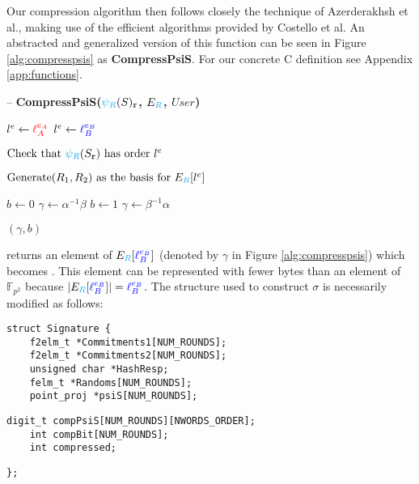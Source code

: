 Our compression algorithm then follows closely the technique of Azerderakhsh et al., making use of the efficient algorithms provided by Costello et al. An abstracted and generalized version of this function can be seen in Figure \ref{alg:compresspsis} as \textbf{CompressPsiS}. For our concrete C definition see Appendix \ref{app:functions}.

\begin{algorithm}
\caption{-- \textbf{CompressPsiS($\textcolor{cyan}{\psi_R}(S)_{\texttt{r}}$, $E_{\textcolor{cyan}{R}}$, $User$)}}
\label{alg:compresspsis}
\begin{algorithmic}[1]
	\State $l^e \gets \textcolor{red}{\ell_{A}^{e_A}}$
\EndIf
{}
	\State $l^e \gets \textcolor{blue}{\ell_{B}^{e_B}}$
\EndIf

\State $\text{Check that } \textcolor{cyan}{\psi_R}(S_{\texttt{r}}) \text{ has order } l^e$

\State $\text{Generate} (R_{1}, R_{2}) \text{ as the basis for } E_{\textcolor{cyan}{R}}[l^e]$

\State {}

	\State $b \gets 0$
	\State $\gamma \gets \alpha^{-1}\beta$
\Else
	\State $b \gets 1$
	\State $\gamma \gets \beta^{-1}\alpha$
\EndIf

\State \Return $(\gamma, b)$
\end{algorithmic}
\end{algorithm}

 returns an element of $E_{\textcolor{cyan}{R}}[\textcolor{blue}{\ell_{B}^{e_B}}]$ (denoted by $\gamma$ in Figure \ref{alg:compresspsis}) which becomes . This element can be represented with fewer bytes than an element of $\mathbb{F}_{p^2}$ because $\vert E_{\textcolor{cyan}{R}}[\textcolor{blue}{\ell_{B}^{e_B}}] \vert = \textcolor{blue}{\ell_{B}^{e_B}}$. The  structure used to construct $\sigma$ is necessarily modified as follows:

\begin{lstlisting}
struct Signature {
	f2elm_t *Commitments1[NUM_ROUNDS];
	f2elm_t *Commitments2[NUM_ROUNDS];
	unsigned char *HashResp;
	felm_t *Randoms[NUM_ROUNDS];
	point_proj *psiS[NUM_ROUNDS];
	\end{lstlisting}
\vspace{-0.75\baselineskip}
\begin{lstlisting}[backgroundcolor=\color{light-green}, firstnumber=7]
	digit_t compPsiS[NUM_ROUNDS][NWORDS_ORDER];
	int compBit[NUM_ROUNDS];
	int compressed;
\end{lstlisting}
\vspace{-0.75\baselineskip}
\begin{lstlisting}[firstnumber=10]
};
\end{lstlisting}
\vspace{15px}

